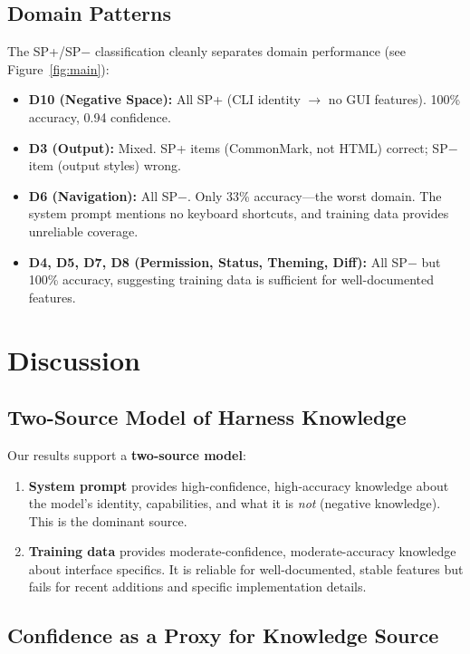 \documentclass[10pt,twocolumn]{article}
\begin{document}
\subsection{Domain Patterns}

The SP+/SP$-$ classification cleanly separates domain performance (see Figure~\ref{fig:main}):
\begin{itemize}
  \item \textbf{D10 (Negative Space):} All SP+ (CLI identity $\rightarrow$ no GUI features). 100\% accuracy, 0.94 confidence.
  \item \textbf{D3 (Output):} Mixed. SP+ items (CommonMark, not HTML) correct; SP$-$ item (output styles) wrong.
  \item \textbf{D6 (Navigation):} All SP$-$. Only 33\% accuracy---the worst domain. The system prompt mentions no keyboard shortcuts, and training data provides unreliable coverage.
  \item \textbf{D4, D5, D7, D8 (Permission, Status, Theming, Diff):} All SP$-$ but 100\% accuracy, suggesting training data is sufficient for well-documented features.
\end{itemize}

\section{Discussion}

\subsection{Two-Source Model of Harness Knowledge}

Our results support a \textbf{two-source model}:
\begin{enumerate}
  \item \textbf{System prompt} provides high-confidence, high-accuracy knowledge about the model's identity, capabilities, and what it is \textit{not} (negative knowledge). This is the dominant source.
  \item \textbf{Training data} provides moderate-confidence, moderate-accuracy knowledge about interface specifics. It is reliable for well-documented, stable features but fails for recent additions and specific implementation details.
\end{enumerate}

\subsection{Confidence as a Proxy for Knowledge Source}
\end{document}
